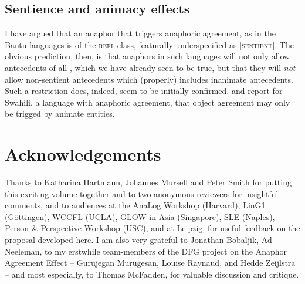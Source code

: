 \documentclass[output=paper, modfonts, nonflat]{langsci/langscibook}
\begin{document}
      \subsection{Sentience and animacy effects}

      I have argued that an anaphor that triggers anaphoric agreement,
      as in the Bantu languages is of the \textsc{refl} class,
      featurally underspecified as [\textsc{sentient}]. The obvious prediction,
      then, is that anaphors in such languages will not only allow
      antecedents of all \person, which we have already seen to be
      true, but that they will \emph{not} allow non-sentient
      antecedents which (properly) includes inanimate
      antecedents. Such a restriction does, indeed, seem to be
      initially confirmed. \citet{woolford:1999} and \citet{vitale:1981} report
      for Swahili, a language with anaphoric agreement, that object
      agreement may only be trigged by animate entities. 

\section*{Acknowledgements}
Thanks to Katharina Hartmann, Johannes Mursell and Peter Smith for putting
this exciting volume together and to two anonymous reviewers for insightful
comments, and to audiences at the AnaLog Workshop (Harvard), LinG1 (Göttingen), 
WCCFL (UCLA), GLOW-in-Asia (Singapore), SLE (Naples), Person \& Perspective Workshop (USC), 
and at Leipzig, for useful feedback on the proposal
developed here. I am also very grateful to Jonathan Bobaljik, Ad Neeleman, to
my erstwhile team-members of the DFG project on the Anaphor Agreement Effect 
-- Gurujegan Murugesan, Louise Raynaud, and Hedde Zeijlstra -- and most
especially, to Thomas McFadden, for valuable discussion and critique.

{\sloppy\printbibliography[heading=subbibliography,notkeyword=this]}
\end{document}
